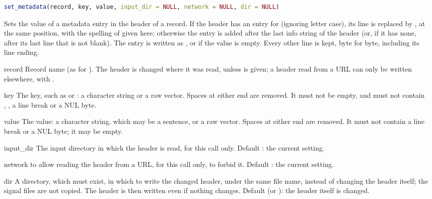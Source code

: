 \begin{lstlisting}[language=R,style=signature]
set_metadata(record, key, value, input_dir = NULL, network = NULL, dir = NULL)
\end{lstlisting}
Sets the value of a metadata entry in the header of a record. If the header has an entry
for  (ignoring letter case), its line is replaced by , at
the same position, with the spelling of  given here; otherwise the entry is
added after the last info string of the header (or, if it has none, after its last line
that is not blank). The entry is written as , or  if
the value is empty. Every other line is kept, byte for byte, including its line ending.
\begin{params}
\item[record] Record name (as for ). The header is changed where it
  was read, unless  is given; a header read from a URL can only be written
  elsewhere, with .
\item[key] The key, such as  or : a character string
  or a raw vector. Spaces at either end are removed. It must not be empty, and must not
  contain \code{:}, \code{\#}, a line break or a NUL byte.
\item[value] The value: a character string, which may be a sentence, or a raw vector.
  Spaces at either end are removed. It must not contain a line break or a NUL byte; it
  may be empty.
\item[input\_dir] The input directory in which the header is read, for this call only.
  Default : the current setting.
\item[network]  to allow reading the header from a URL, for this call only,
   to forbid it. Default : the current setting.
\item[dir] A directory, which must exist, in which to write the changed header, under the
  same file name, instead of changing the header itself; the signal files are not copied.
  The header is then written even if nothing changes. Default  (or ):
  the header itself is changed.
\end{params}
